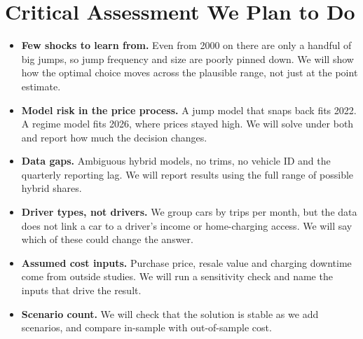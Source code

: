 \documentclass[11pt]{article}
\begin{document}
\section{Critical Assessment We Plan to Do}

\begin{itemize}
  \item \textbf{Few shocks to learn from.} Even from 2000 on there are only a handful of big jumps, so jump frequency and size are poorly pinned down. We will show how the optimal choice moves across the plausible range, not just at the point estimate.
  \item \textbf{Model risk in the price process.} A jump model that snaps back fits 2022. A regime model fits 2026, where prices stayed high. We will solve under both and report how much the decision changes.
  \item \textbf{Data gaps.} Ambiguous hybrid models, no trims, no vehicle ID and the quarterly reporting lag. We will report results using the full range of possible hybrid shares.
  \item \textbf{Driver types, not drivers.} We group cars by trips per month, but the data does not link a car to a driver's income or home-charging access. We will say which of these could change the answer.
  \item \textbf{Assumed cost inputs.} Purchase price, resale value and charging downtime come from outside studies. We will run a sensitivity check and name the inputs that drive the result.
  \item \textbf{Scenario count.} We will check that the solution is stable as we add scenarios, and compare in-sample with out-of-sample cost.
\end{itemize}
\end{document}
